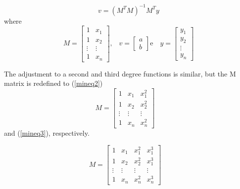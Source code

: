 \documentclass[10pt, conference, compsocconf]{IEEEtran}
\begin{document}
{\begin{equation}
		v =( M^{T}M)^{-1}M^{T}y
	\label{mineq1}
	\end{equation}
	where
	\begin{equation}
	M = \left[\begin{array}{cc}
               	1 & x_{1} \\
               	1 & x_{2}  \\
		\vdots & \vdots  \\
		1 & x_{n}
          	         \end{array}\right] \mbox{,} \quad
	v = \left[\begin{array}{c}
               	a \\
               	b  
          	         \end{array}\right] \mbox{e} \quad
	y = \left[\begin{array}{c}
               	y_{1} \\
               	y_{2}  \\
	 \vdots  \\
		y_{n}
          	         \end{array}\right] 	
	\label{variaveis}
	\end{equation}
	
The adjustment to a second and third degree functions is similar, but the M matrix
is redefined to (\ref{mineq2}) 
\begin{equation}
	M = \left[\begin{array}{ccc}
               	1 & x_{1} & x_{1}^{2} \\
               	1 & x_{2}  & x_{2}^{2}\\
		\vdots & \vdots & \vdots \\
		1 & x_{n} & x_{n}^{2}
          	         \end{array}\right] \quad
	\label{mineq2}
	\end{equation}
	and (\ref{mineq3}), respectively. 

		\begin{equation}
	M = \left[\begin{array}{cccc}
               	1 & x_{1} & x_{1}^{2} & x_{1}^{3} \\
               	1 & x_{2}  & x_{2}^{2} & x_{1}^{3}\\
		\vdots & \vdots  & \vdots & \vdots\\
		1 & x_{n} &  x_{n}^{2} & x_{n}^{3}
          	         \end{array}\right] \quad
	\label{mineq3}
	\end{equation}
	
}
\end{document}

